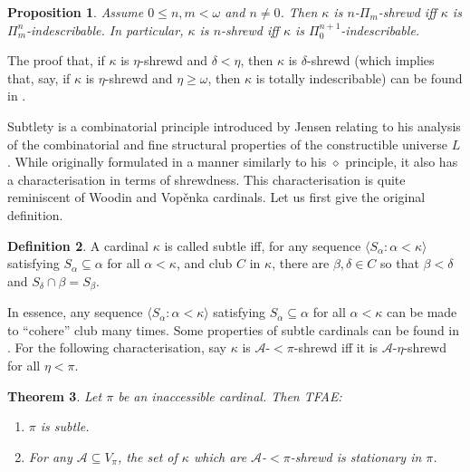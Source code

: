 \documentclass{article}
\theoremstyle{definition}
\newtheorem{definition}{Definition}[section]
\theoremstyle{plain}
\newtheorem{theorem}[definition]{Theorem}
\theoremstyle{plain}
\theoremstyle{plain}
\newtheorem{proposition}[definition]{Proposition}
\theoremstyle{plain}
\theoremstyle{remark}
\theoremstyle{remark}
\theoremstyle{remark}
\theoremstyle{plain}
\theoremstyle{plain}
\theoremstyle{plain}
\begin{document}
\begin{proposition}
\label{ShrewdToIndesc}
Assume $0 \leq n, m < \omega$ and $n \neq 0$. Then $\kappa$ is $n$-$\Pi_m$-shrewd iff $\kappa$ is $\Pi^n_m$-indescribable. In particular, $\kappa$ is $n$-shrewd iff $\kappa$ is $\Pi^{n+1}_0$-indescribable.
\end{proposition}

The proof that, if $\kappa$ is $\eta$-shrewd and $\delta < \eta$, then $\kappa$ is $\delta$-shrewd (which implies that, say, if $\kappa$ is $\eta$-shrewd and $\eta \geq \omega$, then $\kappa$ is totally indescribable) can be found in \cite{rathjen2}. 

Subtlety is a combinatorial principle introduced by Jensen relating to his analysis of the combinatorial and fine structural properties of the constructible universe $L$. While originally formulated in a manner similarly to his $\diamond$ principle, it also has a characterisation in terms of shrewdness. This characterisation is quite reminiscent of Woodin and Vopěnka cardinals. Let us first give the original definition.

\begin{definition}
\label{SubtleDef}
A cardinal $\kappa$ is called subtle iff, for any sequence $\langle S_\alpha: \alpha < \kappa \rangle$ satisfying $S_\alpha \subseteq \alpha$ for all $\alpha < \kappa$, and club $C$ in $\kappa$, there are $\beta, \delta \in C$ so that $\beta < \delta$ and $S_\delta \cap \beta = S_\beta$.
\end{definition}

In essence, any sequence $\langle S_\alpha: \alpha < \kappa \rangle$ satisfying $S_\alpha \subseteq \alpha$ for all $\alpha < \kappa$ can be made to ``cohere'' club many times. Some properties of subtle cardinals can be found in \cite{jensen}. For the following characterisation, say $\kappa$ is $\mathcal{A}$-$< \pi$-shrewd iff it is $\mathcal{A}$-$\eta$-shrewd for all $\eta < \pi$.

\begin{theorem}
\label{SubtleFromShrewd}
Let $\pi$ be an inaccessible cardinal. Then TFAE:

\begin{enumerate}
    \item $\pi$ is subtle.
    \item For any $\mathcal{A} \subseteq V_\pi$, the set of $\kappa$ which are $\mathcal{A}$-$< \pi$-shrewd is stationary in $\pi$.
\end{enumerate}
\end{theorem}
\end{document}
